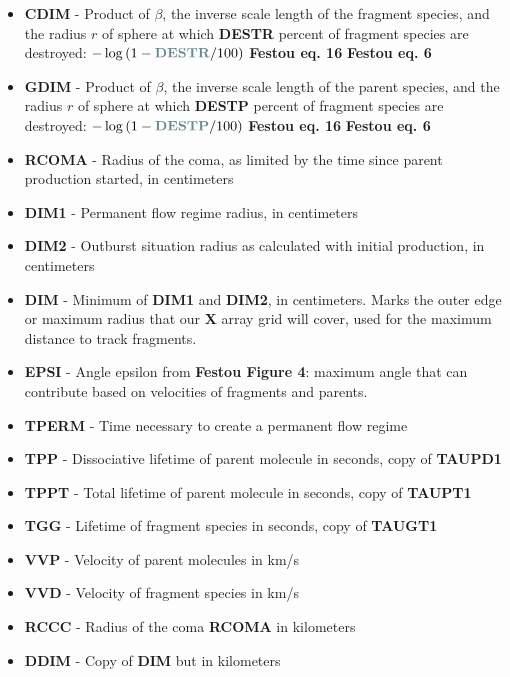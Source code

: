 \documentclass[11pt]{article}
\newcommand{\fortranvar}[1]{\textcolor{myblue}{\textbf{#1}}}
\newcommand{\mytodo}[1]{\colorbox{resultboxcol}{\textbf{#1}}}
\begin{document}
\begin{itemize}
    \item \fortranvar{CDIM} - Product of \(\beta\), the inverse scale length of the fragment species, and the radius \(r\) of sphere at which \fortranvar{DESTR} percent of fragment species are destroyed: \(-\log \left( 1 - \fortranvar{DESTR}/100\right)\) \mytodo{Festou eq. 16} \mytodo{Festou eq. 6}
    \item \fortranvar{GDIM} - Product of \(\beta\), the inverse scale length of the parent species, and the radius \(r\) of sphere at which \fortranvar{DESTP} percent of fragment species are destroyed: \(-\log \left( 1 - \fortranvar{DESTP}/100\right)\) \mytodo{Festou eq. 16} \mytodo{Festou eq. 6}
    \item \fortranvar{RCOMA} - Radius of the coma, as limited by the time since parent production started, in centimeters
    \item \fortranvar{DIM1} - Permanent flow regime radius, in centimeters
    \item \fortranvar{DIM2} - Outburst situation radius as calculated with initial production, in centimeters
    \item \fortranvar{DIM} - Minimum of \fortranvar{DIM1} and \fortranvar{DIM2}, in centimeters.  Marks the outer edge or maximum radius that our \fortranvar{X} array grid will cover, used for the maximum distance to track fragments.
    \item \fortranvar{EPSI} - Angle epsilon from \mytodo{Festou Figure 4}: maximum angle that can contribute based on velocities of fragments and parents.
    \item \fortranvar{TPERM} - Time necessary to create a permanent flow regime
    \item \fortranvar{TPP} - Dissociative lifetime of parent molecule in seconds, copy of \fortranvar{TAUPD1}
    \item \fortranvar{TPPT} - Total lifetime of parent molecule in seconds, copy of \fortranvar{TAUPT1}
    \item \fortranvar{TGG} - Lifetime of fragment species in seconds, copy of \fortranvar{TAUGT1}
    \item \fortranvar{VVP} - Velocity of parent molecules in km/s
    \item \fortranvar{VVD} - Velocity of fragment species in km/s
    \item \fortranvar{RCCC} - Radius of the coma \fortranvar{RCOMA} in kilometers
    \item \fortranvar{DDIM} - Copy of \fortranvar{DIM} but in kilometers

\end{itemize}
\end{document}
